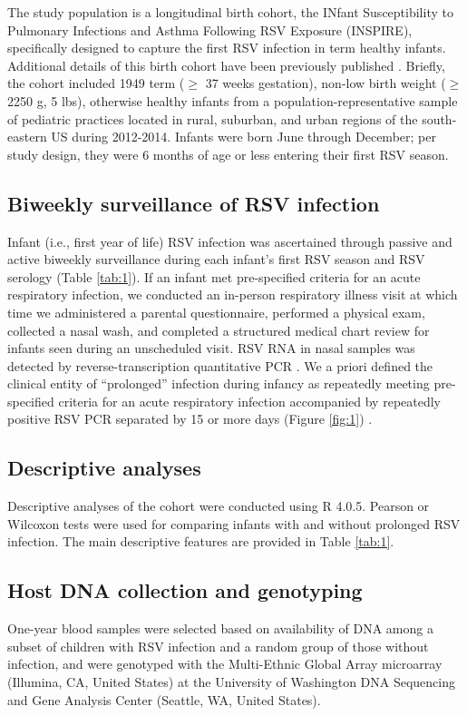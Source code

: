 \documentclass[9pt,lineno]{elife}  %
\begin{document}
The study population is a longitudinal birth cohort, the INfant Susceptibility to Pulmonary Infections and Asthma Following RSV Exposure (INSPIRE), specifically designed to capture the first RSV infection in term healthy infants. Additional details of this birth cohort have been previously published 
\citep{larkin_objectives_2015}. 
Briefly, the cohort included 1949 term ($\ge$ 37 weeks gestation), non-low birth weight ($\ge$ 2250 g, 5 lbs), otherwise healthy infants from a population-representative sample of pediatric practices located in rural, suburban, and urban regions of the south-eastern US during 2012-2014. 
Infants were born June through December; per study design, they were 6 months of age or less entering their first RSV season.

\subsection{Biweekly surveillance of RSV infection}
Infant (i.e., first year of life) RSV infection was ascertained through passive and active biweekly surveillance during each infant’s first RSV season and RSV serology (Table \ref{tab:1}). 
If an infant met pre-specified criteria for an acute respiratory infection, we conducted an in-person respiratory illness visit at which time we administered a parental questionnaire, performed a physical exam, collected a nasal wash, and completed a structured medical chart review for infants seen during an unscheduled visit. RSV RNA in nasal samples was detected by reverse-transcription quantitative PCR 
\citep{larkin2015objectives}. 
We a priori defined the clinical entity of “prolonged” infection during infancy as repeatedly meeting pre-specified criteria for an acute respiratory infection accompanied by repeatedly positive RSV PCR separated by 15 or more days (Figure \ref{fig:1}) 
\citep{okiro2010duration}.

\subsection{Descriptive analyses}
Descriptive analyses of the cohort were conducted using R 4.0.5. 
Pearson or Wilcoxon tests were used for comparing infants with and without prolonged RSV infection. 
The main descriptive features are provided in Table \ref{tab:1}.

\subsection{Host DNA collection and genotyping}
One-year blood samples were selected based on availability of DNA among a subset of children with RSV infection and a random group of those without infection, and were genotyped with the Multi-Ethnic Global Array microarray (Illumina, CA, United States) at the University of Washington DNA Sequencing and Gene Analysis Center (Seattle, WA, United States).
\end{document}
